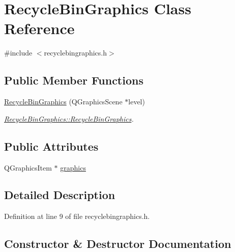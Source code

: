 \hypertarget{class_recycle_bin_graphics}{}\section{Recycle\+Bin\+Graphics Class Reference}
\label{class_recycle_bin_graphics}


{\ttfamily \#include $<$recyclebingraphics.\+h$>$}

\subsection*{Public Member Functions}
\begin{DoxyCompactItemize}
\item 
\hyperlink{class_recycle_bin_graphics_afe8714eec166ad6a723d382f60beaa74}{Recycle\+Bin\+Graphics} (Q\+Graphics\+Scene $\ast$level)
\begin{DoxyCompactList}\small\item\em \hyperlink{class_recycle_bin_graphics_afe8714eec166ad6a723d382f60beaa74}{Recycle\+Bin\+Graphics\+::\+Recycle\+Bin\+Graphics}. \end{DoxyCompactList}\end{DoxyCompactItemize}
\subsection*{Public Attributes}
\begin{DoxyCompactItemize}
\item 
Q\+Graphics\+Item $\ast$ \hyperlink{class_recycle_bin_graphics_af2e892576d357f795b21027c55557570}{graphics}
\end{DoxyCompactItemize}


\subsection{Detailed Description}


Definition at line 9 of file recyclebingraphics.\+h.



\subsection{Constructor \& Destructor Documentation}
